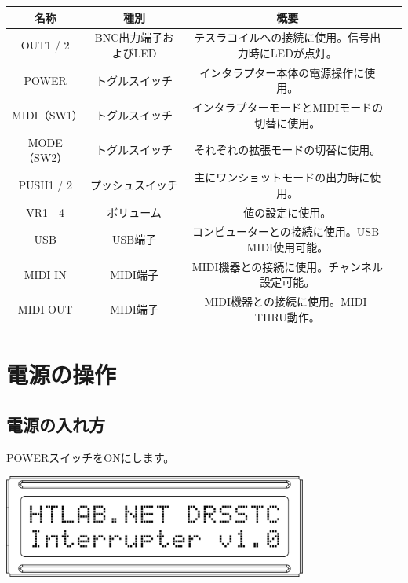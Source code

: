 \documentclass[a4paper,11pt]{jsarticle}
\begin{document}
\begin{table}[htbp]
\begin{center}
\begin{tabular}{ | c | c | c | c | }
\hline
\textbf{名称} & \textbf{種別} & \textbf{概要} \\\hline
OUT1 / 2 & BNC出力端子およびLED & テスラコイルへの接続に使用。信号出力時にLEDが点灯。 \\\hline
POWER & トグルスイッチ & インタラプター本体の電源操作に使用。 \\\hline
MIDI（SW1） & トグルスイッチ & インタラプターモードとMIDIモードの切替に使用。 \\\hline
MODE（SW2） & トグルスイッチ & それぞれの拡張モードの切替に使用。 \\\hline
PUSH1 / 2 & プッシュスイッチ & 主にワンショットモードの出力時に使用。 \\\hline
VR1 - 4 & ボリューム & 値の設定に使用。 \\\hline
USB & USB端子 & コンピューターとの接続に使用。USB-MIDI使用可能。 \\\hline
MIDI IN & MIDI端子 & MIDI機器との接続に使用。チャンネル設定可能。 \\\hline
MIDI OUT & MIDI端子 & MIDI機器との接続に使用。MIDI-THRU動作。 \\\hline
\end{tabular}
\end{center}
\end{table}


\clearpage


\section{電源の操作}

\subsection{電源の入れ方}

POWERスイッチをONにします。

\vspace*{10mm}
\begin{center}
\includegraphics[width=100mm]{image/Arduino_Interrupter_v1_LCD.png}
\end{center}
\vspace*{10mm}
\end{document}
